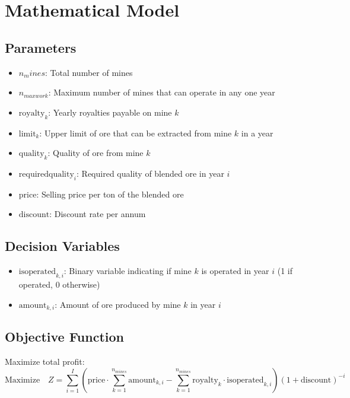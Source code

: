 \documentclass{article}
\begin{document}
\section*{Mathematical Model}

\subsection*{Parameters}
\begin{itemize}
    \item \( n_mines \): Total number of mines
    \item \( n_{maxwork} \): Maximum number of mines that can operate in any one year
    \item \( \text{royalty}_{k} \): Yearly royalties payable on mine \( k \)
    \item \( \text{limit}_{k} \): Upper limit of ore that can be extracted from mine \( k \) in a year
    \item \( \text{quality}_{k} \): Quality of ore from mine \( k \)
    \item \( \text{requiredquality}_{i} \): Required quality of blended ore in year \( i \)
    \item \( \text{price} \): Selling price per ton of the blended ore
    \item \( \text{discount} \): Discount rate per annum
\end{itemize}

\subsection*{Decision Variables}
\begin{itemize}
    \item \( \text{isoperated}_{k,i} \): Binary variable indicating if mine \( k \) is operated in year \( i \) (1 if operated, 0 otherwise)
    \item \( \text{amount}_{k,i} \): Amount of ore produced by mine \( k \) in year \( i \)
\end{itemize}

\subsection*{Objective Function}
Maximize total profit:
\[
\text{Maximize} \quad Z = \sum_{i=1}^{I} \left( \text{price} \cdot \sum_{k=1}^{n_{mines}} \text{amount}_{k,i} - \sum_{k=1}^{n_{mines}} \text{royalty}_{k} \cdot \text{isoperated}_{k,i} \right) (1+\text{discount})^{-i}
\]
\end{document}
